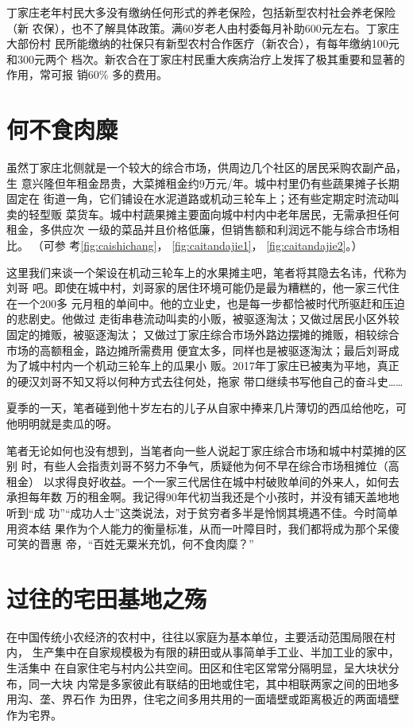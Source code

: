 丁家庄老年村民大多没有缴纳任何形式的养老保险，包括新型农村社会养老保险（新
农保），也不了解具体政策。满60岁老人由村委每月补助600元左右。丁家庄大部份村
民所能缴纳的社保只有新型农村合作医疗（新农合），有每年缴纳100元和300元两个
档次。新农合在丁家庄村民重大疾病治疗上发挥了极其重要和显著的作用，常可报
销60\% 多的费用。

\section{何不食肉糜}

虽然丁家庄北侧就是一个较大的综合市场，供周边几个社区的居民采购农副产品，生
意兴隆但年租金昂贵，大菜摊租金约9万元/年。城中村里仍有些蔬果摊子长期固定在
街道一角，它们铺设在水泥道路或机动三轮车上；还有些定期定时流动叫卖的轻型贩
菜货车。城中村蔬果摊主要面向城中村内中老年居民，无需承担任何租金，多供应次
一级的菜品并且价格低廉，但销售额和利润远不能与综合市场相比。 （可参
考\cref{fig:caishichang}， \cref{fig:caitandajie1}，
\cref{fig:caitandajie2}。）

这里我们来谈一个架设在机动三轮车上的水果摊主吧，笔者将其隐去名讳，代称为刘哥
吧。即使在城中村，刘哥家的居住环境可能仍是最为糟糕的，他一家三代住在一个200多
元月租的单间中。他的立业史，也是每一步都恰被时代所驱赶和压迫的悲剧史。他做过
走街串巷流动叫卖的小贩，被驱逐淘汰；又做过居民小区外较固定的摊贩，被驱逐淘汰；
又做过丁家庄综合市场外路边摆摊的摊贩，相较综合市场的高额租金，路边摊所需费用
便宜太多，同样也是被驱逐淘汰；最后刘哥成为了城中村内一个机动三轮车上的瓜果小
贩。2017年丁家庄已被夷为平地，真正的硬汉刘哥不知又将以何种方式去往何处，拖家
带口继续书写他自己的奋斗史……

夏季的一天，笔者碰到他十岁左右的儿子从自家中捧来几片薄切的西瓜给他吃，可
他明明就是卖瓜的呀。

笔者无论如何也没有想到，当笔者向一些人说起丁家庄综合市场和城中村菜摊的区别
时，有些人会指责刘哥不努力不争气，质疑他为何不早在综合市场租摊位（高租金）
以求得良好收益。一个一家三代居住在城中村破败单间的外来人，如何去承担每年数
万的租金啊。我记得90年代初当我还是个小孩时，并没有铺天盖地地听到“成
功”“成功人士”这类说法，对于贫穷者多半是怜悯其境遇不佳。今时简单用资本结
果作为个人能力的衡量标准，从而一叶障目时，我们都将成为那个呆傻可笑的晋惠
帝，“百姓无粟米充饥，何不食肉糜？”


\section{过往的宅田基地之殇}

在中国传统小农经济的农村中，往往以家庭为基本单位，主要活动范围局限在村内，
生产集中在自家规模极为有限的耕田或从事简单手工业、半加工业的家中，生活集中
在自家住宅与村内公共空间。田区和住宅区常常分隔明显，呈大块状分布，同一大块
内常是多家彼此有联结的田地或住宅，其中相联两家之间的田地多用沟、垄、界石作
为田界，住宅之间多用共用的一面墙壁或距离极近的两面墙壁作为宅界。

